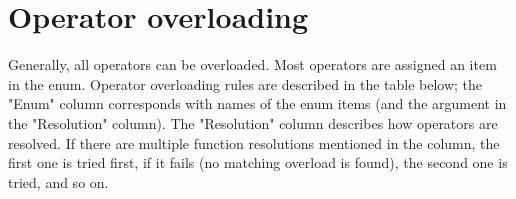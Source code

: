 
\section{Operator overloading} \label{operatorOverloading}
Generally, all operators can be overloaded. Most operators are assigned an item in the  enum. Operator overloading rules are described in the table below; the "Enum" column corresponds with names of the  enum items (and the  argument in the "Resolution" column). The "Resolution" column describes how operators are resolved. If there are multiple function resolutions mentioned in the column, the first one is tried first, if it fails (no matching overload is found), the second one is tried, and so on.

